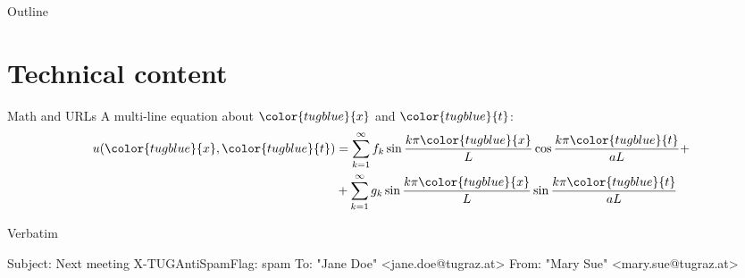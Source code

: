 \documentclass[table,aspectratio=43]{beamer}
\begin{document}
  \begin{frame}{Outline}
    \tableofcontents[currentsection]
  \end{frame}




  \section{Technical content}

  \newcommand{\blue}[1]{{\color{tugblue}{#1}}}
  \begin{frame}{Math and URLs}
    A multi-line equation about $\blue{x}$ and $\blue{t}$:
    \begin{align*}
      u(\blue{x},\blue{t}) & = \sum_{k=1}^{\infty} f_k \sin \frac{k \pi \blue{x}}{L} \cos \frac{k \pi \blue{t}}{aL} + \\
                           & + \sum_{k=1}^{\infty} g_k \sin \frac{k \pi \blue{x}}{L} \sin \frac{k \pi \blue{t}}{aL}
    \end{align*}
  \end{frame}

  \begin{frame}[fragile]{Verbatim}
    \begin{semiverbatim}
      Subject: Next meeting
      \alert{X-TUGAntiSpamFlag: spam}
      To: "Jane Doe" <jane.doe@tugraz.at>
      From: "Mary Sue" <mary.sue@tugraz.at>
    \end{semiverbatim}
  \end{frame}
\end{document}
